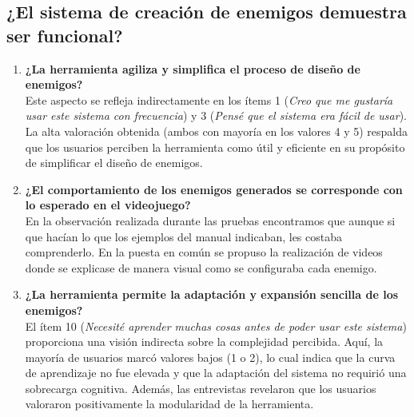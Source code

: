 \subsection{¿El sistema de creación de enemigos demuestra ser funcional?}

\begin{enumerate}
    \item \textbf{¿La herramienta agiliza y simplifica el proceso de diseño de enemigos?} \\
    Este aspecto se refleja indirectamente en los ítems 1 (\textit{Creo que me gustaría usar este sistema con frecuencia}) y 3 (\textit{Pensé que el sistema era fácil de usar}). La alta valoración obtenida (ambos con mayoría en los valores 4 y 5) respalda que los usuarios perciben la herramienta como útil y eficiente en su propósito de simplificar el diseño de enemigos.

    \item \textbf{¿El comportamiento de los enemigos generados se corresponde con lo esperado en el videojuego?} \\
    En la observación realizada durante las pruebas encontramos que aunque si que hacían lo que los ejemplos del manual indicaban, les costaba comprenderlo. En la puesta en común se propuso la realización de videos donde se explicase de manera visual como se configuraba cada enemigo.

    \item \textbf{¿La herramienta permite la adaptación y expansión sencilla de los enemigos?} \\
    El ítem 10 (\textit{Necesité aprender muchas cosas antes de poder usar este sistema}) proporciona una visión indirecta sobre la complejidad percibida. Aquí, la mayoría de usuarios marcó valores bajos (1 o 2), lo cual indica que la curva de aprendizaje no fue elevada y que la adaptación del sistema no requirió una sobrecarga cognitiva. Además, las entrevistas revelaron que los usuarios valoraron positivamente la modularidad de la herramienta.
\end{enumerate}
